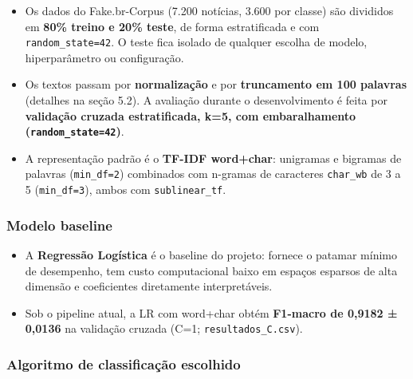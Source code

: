 \documentclass[
  brazilian,
  11pt,
]{article}
\providecommand{\tightlist}{%
  \setlength{\itemsep}{0pt}\setlength{\parskip}{0pt}}
\begin{document}
\begin{itemize}
\tightlist
\item
  Os dados do Fake.br-Corpus (7.200 notícias, 3.600 por classe) são divididos em \textbf{80\% treino e 20\% teste}, de forma estratificada e com \texttt{random\_state=42}. O teste fica isolado de qualquer escolha de modelo, hiperparâmetro ou configuração.
\item
  Os textos passam por \textbf{normalização} e por \textbf{truncamento em 100 palavras} (detalhes na seção 5.2). A avaliação durante o desenvolvimento é feita por \textbf{validação cruzada estratificada, k=5, com embaralhamento (\texttt{random\_state=42})}.
\item
  A representação padrão é o \textbf{TF-IDF word+char}: unigramas e bigramas de palavras (\texttt{min\_df=2}) combinados com n-gramas de caracteres \texttt{char\_wb} de 3 a 5 (\texttt{min\_df=3}), ambos com \texttt{sublinear\_tf}.
\end{itemize}

\subsubsection{Modelo baseline}\label{modelo-baseline}

\begin{itemize}
\tightlist
\item
  A \textbf{Regressão Logística} é o baseline do projeto: fornece o patamar mínimo de desempenho, tem custo computacional baixo em espaços esparsos de alta dimensão e coeficientes diretamente interpretáveis.
\item
  Sob o pipeline atual, a LR com word+char obtém \textbf{F1-macro de 0,9182 ± 0,0136} na validação cruzada (C=1; \texttt{resultados\_C.csv}).
\end{itemize}

\subsubsection{Algoritmo de classificação escolhido}\label{algoritmo-de-classificauxe7uxe3o-escolhido}
\end{document}
